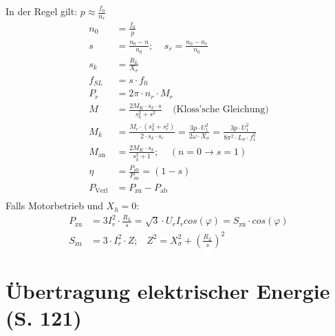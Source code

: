 \documentclass[a4paper,twocolumn,10pt]{article}
\begin{document}
In der Regel gilt: $p\approx\frac{f_0}{n_r}$
\begin{equation*}
\begin{split}
n_0&=\frac{f_0}{p}\\
s&=\frac{n_0-n}{n_0};\;\;\;\;s_r=\frac{n_0-n_r}{n_0}\\
s_k&=\frac{R_L}{X_{\sigma}}\\
f_{SL}&=s\cdot f_0\\
P_r&=2\pi\cdot n_r\cdot M_r\\
M&=\frac{2M_K\cdot s_k\cdot s}{s_k^2+s^2}\;\;\;\;\text{(Kloss'sche Gleichung)}\\
M_k&=\frac{M_r\cdot\left(s_k^2+s_r^2\right)}{2\cdot s_k\cdot s_r}=\frac{3p\cdot U_1^2}{2\omega\cdot X_{\sigma}}=\frac{3p\cdot U_1^2}{8\pi^2\cdot L_{\sigma}\cdot f_1^2}\\
M_{\text{an}}&=\frac{2M_K\cdot s_k}{s_k^2+1};\;\;\;\;(n=0\rightarrow s=1)\\
\eta&=\frac{P_{\text{ab}}}{P_{\text{zu}}}=(1-s)\\
P_{\text{Verl}}&=P_{\text{zu}}-P_{\text{ab}}\\
\end{split}
\end{equation*}
Falls Motorbetrieb und $X_h=0$:
\begin{equation*}
\begin{split}
P_{\text{zu}}&=3I_r^2\cdot\frac{R_L}{s}=\sqrt{3}\cdot U_rI_rcos(\varphi)=S_{\text{zu}}\cdot cos(\varphi)\\
S_{\text{zu}}&=3\cdot I_r^2\cdot Z;\;\;\;Z^2=X_{\sigma}^2+\left(\frac{R_L}{s}\right)^2
\end{split}
\end{equation*}


\section{Übertragung elektrischer Energie (S. 121)}
\end{document}

